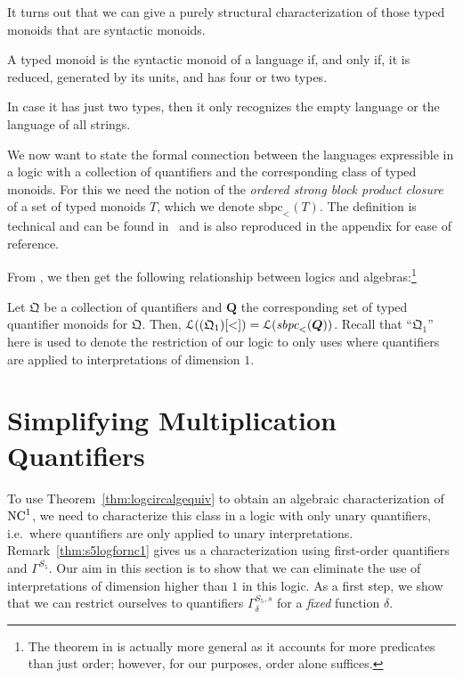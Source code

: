 \documentclass[a4paper,UKenglish,cleveref, autoref, thm-restate, anonymous]{lipics-v2021}
\begin{document}
It turns out that we can give a purely structural characterization of those typed monoids that are syntactic monoids.

\begin{proposition}
    A typed monoid is the syntactic monoid of a language if, and only if, it is reduced, generated by its units, and has four or two types.

In case it has just two types, then it only recognizes the empty language or the language of all strings.
\end{proposition}

We now want to state the formal connection between the languages expressible in a logic with a collection of quantifiers and the corresponding class of typed monoids.  For this we need the notion of the \emph{ordered strong block product closure} of a set of typed monoids $T$, which we denote $\mathrm{sbpc}_<(T)$.  The definition is technical and can be found in~\cite{krebs2008typed} and is also reproduced in the appendix for ease of reference.

From \cite[Theorem 4.14]{krebs2008typed}, we then get the following relationship between logics and algebras:\footnote{The theorem in \cite{krebs2008typed} is actually more general as it accounts for more predicates than just order; however, for our purposes, order alone suffices.}
\begin{theorem}\label{thm:logcircalgequiv}
     Let $\mathfrak{Q}$ be a collection of quantifiers and $\bm{Q}$ the corresponding set of typed quantifier monoids for $\mathfrak{Q}$. Then, \(
        \mathcal{L}((\mathfrak{Q}_1)[<]) = \mathcal{L}(\emph{sbpc}_<(\bm{Q}))
    \). Recall that ``$\mathfrak{Q}_1$'' here is used to denote the restriction of our logic to only uses where quantifiers are applied to interpretations of dimension $1$.
\end{theorem}

\section{Simplifying Multiplication Quantifiers}\label{sec:mult}

To use Theorem~\ref{thm:logcircalgequiv} to obtain an algebraic characterization of $\mathrm{NC}^1$, we need to characterize this class in a logic with only unary quantifiers, i.e.\ where quantifiers are only applied to unary interpretations.  Remark~\ref{thm:s5logfornc1} gives us a characterization using first-order quantifiers and $\Gamma^{S_5}$.  Our aim in this section is to show that we can eliminate the use of interpretations of dimension higher than $1$ in this logic.  As a first step, we show that we can restrict ourselves to quantifiers $\Gamma^{{S_5},s}_{\delta}$ for a \emph{fixed} function $\delta$.
\end{document}
